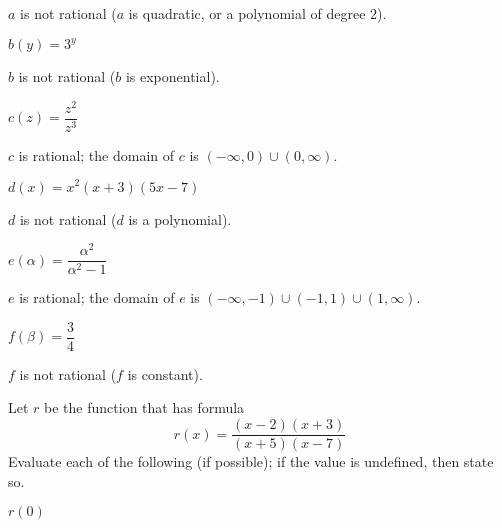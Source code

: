 \begin{exercises}
\begin{problem}
\begin{multicols}{3}
\begin{subproblem}
		\begin{shortsolution}
			$a$ is not rational ($a$ is quadratic, or a polynomial of degree $2$).
		\end{shortsolution}
	\end{subproblem}
	\begin{subproblem}
		$b(y)=3^y$
		\begin{shortsolution}
			$b$ is not rational ($b$ is exponential).
		\end{shortsolution}
	\end{subproblem}
	\begin{subproblem}
		$c(z)=\dfrac{z^2}{z^3}$ 
		\begin{shortsolution}
			$c$ is rational; the domain of $c$ is $(-\infty,0)\cup (0,\infty)$.
		\end{shortsolution}
	\end{subproblem}
	\begin{subproblem}
		$d(x)=x^2(x+3)(5x-7)$ 
		\begin{shortsolution}
			$d$ is not rational ($d$ is a polynomial).
		\end{shortsolution}
	\end{subproblem}
	\begin{subproblem}
		$e(\alpha)=\dfrac{\alpha^2}{\alpha^2-1}$ 
		\begin{shortsolution}
			$e$ is rational; the domain of $e$ is $(-\infty,-1)\cup(-1,1)\cup(1,\infty)$.
		\end{shortsolution}
	\end{subproblem}
	\begin{subproblem}
		$f(\beta)=\dfrac{3}{4}$ 
		\begin{shortsolution}
			$f$ is not rational ($f$ is constant).
		\end{shortsolution}
	\end{subproblem}
\end{multicols}
\end{problem}
\begin{problem}
Let $r$ be the function that has formula 
\[
	r(x)=\frac{(x-2)(x+3)}{(x+5)(x-7)}
\]
Evaluate each of the following (if possible); if the value is undefined, 
then state so.
\begin{multicols}{4}
	\begin{subproblem}
		$r(0)$ 
		\begin{shortsolution}
			$\begin{aligned}[t]

\end{aligned}
\end{shortsolution}
\end{subproblem}
\end{multicols}
\end{problem}
\end{exercises}
